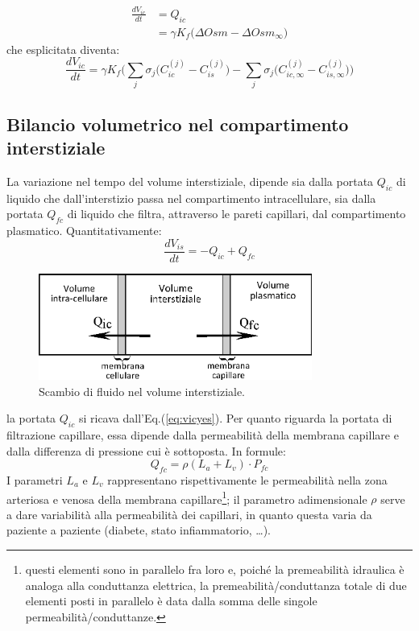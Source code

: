\begin{equation}\label{eq:vicyes}
	\begin{split}
	\frac{dV_{ic}}{dt} &= Q_{ic}\\
										 &= \gamma K_f \bigl(\Delta Osm - \Delta Osm_{\infty}\bigr)
	\end{split}										 
\end{equation}
che esplicitata diventa:
\begin{equation*}
	\frac{dV_{ic}}{dt} = \gamma K_f \biggl(\sum_j{\sigma_j\bigl(C_{ic}^{(j)}-C_{is}^{(j)}\bigr)} - \sum_j{\sigma_j\bigl(C_{ic,\infty}^{(j)}-C_{is,\infty}^{(j)}\bigr)}\biggr)
\end{equation*}

\subsection{Bilancio volumetrico nel compartimento interstiziale}
La variazione nel tempo del volume interstiziale, dipende sia dalla portata $Q_{ic}$ di liquido che dall'interstizio passa nel compartimento intracellulare, sia dalla portata $Q_{fc}$ di liquido che filtra, attraverso le pareti capillari, dal compartimento plasmatico. Quantitativamente:
\begin{equation}
	\frac{dV_{is}}{dt} = - Q_{ic} + Q_{fc}
\end{equation}
\begin{figure}[htb]
	\centering
		\includegraphics[width=0.8\textwidth]{immagini/vol_is.eps}
				\caption{Scambio di fluido nel volume interstiziale.}
\end{figure}
la portata $Q_{ic}$ si ricava dall'Eq.(\ref{eq:vicyes}). Per quanto riguarda la portata di filtrazione capillare, essa dipende dalla permeabilità della membrana capillare e dalla differenza di pressione cui è sottoposta. In formule:
\begin{equation}\label{eq:qfcnot}
	Q_{fc} = \rho(L_a+L_v)\cdot P_{fc}
\end{equation}
I parametri $L_a$ e $L_v$ rappresentano rispettivamente le permeabilità nella zona arteriosa e venosa della membrana capillare\footnote{questi elementi sono in parallelo fra loro e, poiché la premeabilità idraulica è analoga alla conduttanza elettrica, la premeabilità/conduttanza totale di due elementi posti in parallelo è data dalla somma delle singole permeabilità/conduttanze.}; il parametro adimensionale $\rho$ serve a dare variabilità alla permeabilità dei capillari, in quanto questa varia da paziente a paziente (diabete, stato infiammatorio, \ldots).

